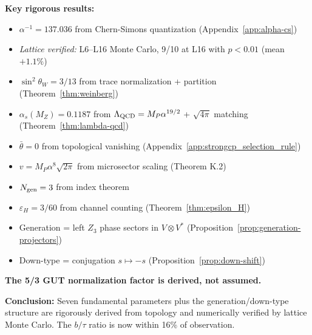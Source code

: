 \begin{tcolorbox}[colback=green!5!white, colframe=green!50!black,
  title=Summary: Standard Model Parameters from Topology, 
  boxsep=2pt, left=3pt, right=3pt]
\textbf{Key rigorous results:}
\begin{itemize}[nosep,leftmargin=*]
\item $\alpha^{-1} = 137.036$ from Chern-Simons quantization (Appendix~\ref{app:alpha-cs})
\item \textit{Lattice verified:} L6--L16 Monte Carlo, 9/10 at L16 with $p < 0.01$ (mean $+1.1\%$)
\item $\sin^2\theta_W = 3/13$ from trace normalization + partition (Theorem~\ref{thm:weinberg})
\item $\alpha_s(M_Z) = 0.1187$ from $\Lambda_{\rm QCD} = M_P\alpha^{19/2}$ + $\sqrt{4\pi}$ matching (Theorem~\ref{thm:lambda-qcd})
\item $\bar{\theta} = 0$ from topological vanishing (Appendix~\ref{app:strongcp_selection_rule})
\item $v = M_P\alpha^8\sqrt{2\pi}$ from microsector scaling (Theorem K.2)
\item $N_{\rm gen} = 3$ from index theorem
\item $\varepsilon_H = 3/60$ from channel counting (Theorem~\ref{thm:epsilon_H})
\item Generation = left $Z_3$ phase sectors in $V \otimes V^*$ (Proposition~\ref{prop:generation-projectors})
\item Down-type = conjugation $s \mapsto -s$ (Proposition~\ref{prop:down-shift})
\end{itemize}

\textbf{The 5/3 GUT normalization factor is derived, not assumed.}

\textbf{Conclusion:} Seven fundamental parameters plus the generation/down-type structure 
are rigorously derived from topology and numerically verified by lattice Monte Carlo. 
The $b/\tau$ ratio is now within 16\% of observation.
\end{tcolorbox}
